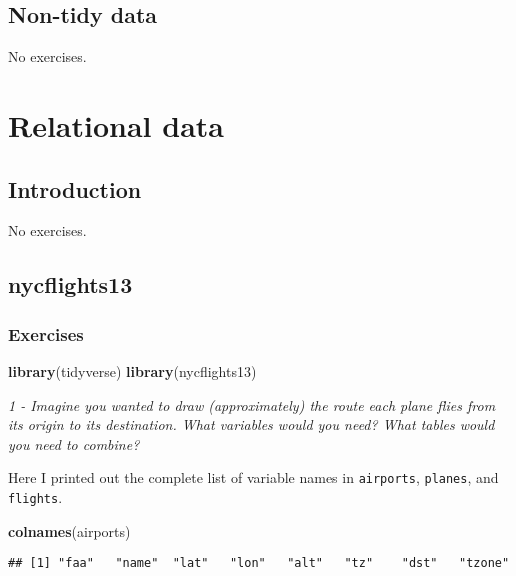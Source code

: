 \documentclass[]{article}
\newenvironment{Shaded}{\begin{snugshade}}{\end{snugshade}}
\newcommand{\KeywordTok}[1]{\textcolor[rgb]{0.13,0.29,0.53}{\textbf{#1}}}
\newcommand{\NormalTok}[1]{#1}
\theoremstyle{definition}
\theoremstyle{definition}
\theoremstyle{definition}
\theoremstyle{remark}
\begin{document}
\subsection{Non-tidy data}\label{non-tidy-data}

No exercises.

\section{Relational data}\label{relational-data}

\subsection{Introduction}\label{introduction-9}

No exercises.

\subsection{nycflights13}\label{nycflights13}

\subsubsection{Exercises}\label{exercises-26}

\begin{Shaded}
\begin{Highlighting}[]
\KeywordTok{library}\NormalTok{(tidyverse)}
\KeywordTok{library}\NormalTok{(nycflights13)}
\end{Highlighting}
\end{Shaded}

\emph{1 - Imagine you wanted to draw (approximately) the route each
plane flies from its origin to its destination. What variables would you
need? What tables would you need to combine?}

Here I printed out the complete list of variable names in
\texttt{airports}, \texttt{planes}, and \texttt{flights}.

\begin{Shaded}
\begin{Highlighting}[]
\KeywordTok{colnames}\NormalTok{(airports)}
\end{Highlighting}
\end{Shaded}

\begin{verbatim}
## [1] "faa"   "name"  "lat"   "lon"   "alt"   "tz"    "dst"   "tzone"
\end{verbatim}
\end{document}
